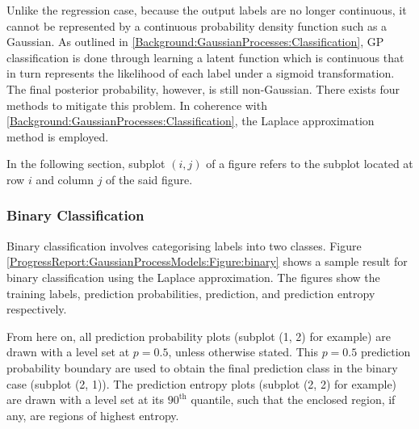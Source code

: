 			Unlike the regression case, because the output labels are no longer continuous, it cannot be represented by a continuous probability density function such as a Gaussian. As outlined in \cref{Background:GaussianProcesses:Classification}, GP classification is done through learning a latent function which is continuous that in turn represents the likelihood of each label under a sigmoid transformation. The final posterior probability, however, is still non-Gaussian. There exists four methods to mitigate this problem. In coherence with \cref{Background:GaussianProcesses:Classification}, the Laplace approximation method is employed.
			
			In the following section, subplot $(i, j)$ of a figure refers to the subplot located at row $i$ and column $j$ of the said figure.
						
			\subsubsection{Binary Classification}

				Binary classification involves categorising labels into two classes. Figure \ref{ProgressReport:GaussianProcessModels:Figure:binary} shows a sample result for binary classification using the Laplace approximation. The figures show the training labels, prediction probabilities, prediction, and prediction entropy respectively.
				
				From here on, all prediction probability plots (subplot (1, 2) for example) are drawn with a level set at $p = 0.5$, unless otherwise stated. This $p = 0.5$ prediction probability boundary are used to obtain the final prediction class in the binary case (subplot (2, 1)). The prediction entropy plots (subplot (2, 2) for example) are drawn with a level set at its $90^{\mathrm{th}}$ quantile, such that the enclosed region, if any, are regions of highest entropy.
				
